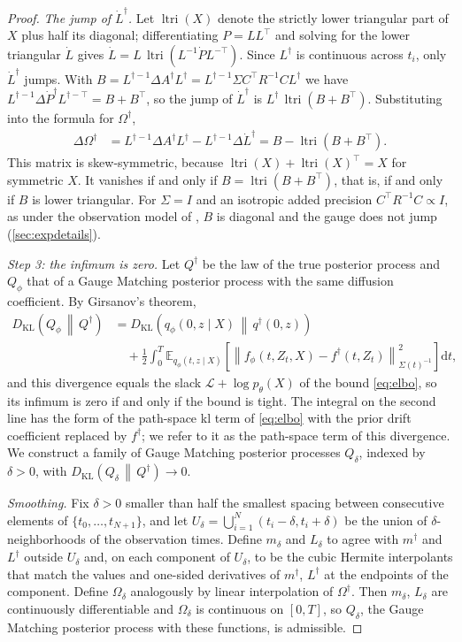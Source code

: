 \documentclass{article} %
\newcommand{\postdrift}{f}
\newcommand{\obs}{X}
\newcommand{\gauge}{\Omega}
\newcommand{\ltri}{\operatorname{ltri}}
\newcommand{\KL}[2]{D_{\mathrm{KL}}\left(#1 \,\middle\|\, #2\right)}
\newcommand{\E}{\mathbb{E}}
\newcommand{\loss}{\mathcal{L}}
\newcommand{\diff}{{\mathrm{d}}}
\begin{document}
\begin{proof}
\emph{The jump of $\dot L^\dagger$.} Let $\ltri(X)$ denote the strictly lower triangular part of $X$ plus half its diagonal; differentiating $P = L L^\top$ and solving for the lower triangular $\dot L$ gives $\dot L = L \, \ltri(L^{-1} \dot P L^{-\top})$. Since $L^\dagger$ is continuous across $t_i$, only $\dot L^\dagger$ jumps. With $B = L^{\dagger -1} \Delta A^\dagger L^\dagger = L^{\dagger -1} \Sigma C^\top R^{-1} C L^\dagger$ we have $L^{\dagger -1} \Delta \dot P^\dagger L^{\dagger -\top} = B + B^\top$, so the jump of $\dot L^\dagger$ is $L^\dagger \, \ltri(B + B^\top)$. Substituting into the formula for $\gauge^\dagger$,
\begin{align*}
    \Delta \gauge^\dagger &= L^{\dagger -1} \Delta A^\dagger L^\dagger - L^{\dagger -1} \Delta \dot L^\dagger = B - \ltri(B + B^\top).
\end{align*}
This matrix is skew-symmetric, because $\ltri(X) + \ltri(X)^\top = X$ for symmetric $X$. It vanishes if and only if $B = \ltri(B + B^\top)$, that is, if and only if $B$ is lower triangular. For $\Sigma = I$ and an isotropic added precision $C^\top R^{-1} C \propto I$, as under the observation model of \citet{smith2026closing}, $B$ is diagonal and the gauge does not jump (\cref{sec:expdetails}).

\emph{Step 3: the infimum is zero.} Let $Q^\dagger$ be the law of the true posterior process and $Q_\phi$ that of a Gauge Matching posterior process with the same diffusion coefficient. By Girsanov's theorem,
\begin{align*}
    \KL{Q_\phi}{Q^\dagger} &= \KL{q_\phi(0, z \mid \obs)}{q^\dagger(0, z)} \\
    &\quad + \frac{1}{2} \int_0^T \E_{q_\phi(t, z \mid \obs)} \left[ \left\| \postdrift_\phi(t, Z_t, \obs) - \postdrift^\dagger(t, Z_t) \right\|_{\Sigma(t)^{-1}}^2 \right] \diff t,
\end{align*}
and this divergence equals the slack $\loss + \log p_\theta(\obs)$ of the bound \cref{eq:elbo}, so its infimum is zero if and only if the bound is tight. The integral on the second line has the form of the path-space \gls{kl} term of \cref{eq:elbo} with the prior drift coefficient replaced by $\postdrift^\dagger$; we refer to it as the path-space term of this divergence. We construct a family of Gauge Matching posterior processes $Q_\delta$, indexed by $\delta > 0$, with $\KL{Q_\delta}{Q^\dagger} \to 0$.

\emph{Smoothing.} Fix $\delta > 0$ smaller than half the smallest spacing between consecutive elements of $\{t_0, \ldots, t_{N+1}\}$, and let $U_\delta = \bigcup_{i=1}^N (t_i - \delta, t_i + \delta)$ be the union of $\delta$-neighborhoods of the observation times. Define $m_\delta$ and $L_\delta$ to agree with $m^\dagger$ and $L^\dagger$ outside $U_\delta$ and, on each component of $U_\delta$, to be the cubic Hermite interpolants that match the values and one-sided derivatives of $m^\dagger$, $L^\dagger$ at the endpoints of the component. Define $\gauge_\delta$ analogously by linear interpolation of $\gauge^\dagger$. Then $m_\delta$, $L_\delta$ are continuously differentiable and $\gauge_\delta$ is continuous on $[0, T]$, so $Q_\delta$, the Gauge Matching posterior process with these functions, is admissible.


\end{proof}
\end{document}

